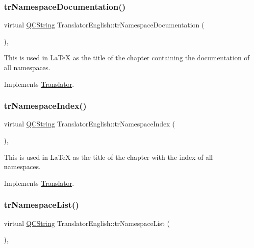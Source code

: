 \subsubsection{\texorpdfstring{trNamespaceDocumentation()}{trNamespaceDocumentation()}}
{\footnotesize\ttfamily virtual \mbox{\hyperlink{class_q_c_string}{Q\+C\+String}} Translator\+English\+::tr\+Namespace\+Documentation (\begin{DoxyParamCaption}{ }\end{DoxyParamCaption})\hspace{0.3cm}{\ttfamily [inline]}, {\ttfamily [virtual]}}

This is used in La\+TeX as the title of the chapter containing the documentation of all namespaces. 

Implements \mbox{\hyperlink{class_translator}{Translator}}.

\mbox{\label{class_translator_english_a91526c150b51f073cbaa179834a6dfd4}} 
\subsubsection{\texorpdfstring{trNamespaceIndex()}{trNamespaceIndex()}}
{\footnotesize\ttfamily virtual \mbox{\hyperlink{class_q_c_string}{Q\+C\+String}} Translator\+English\+::tr\+Namespace\+Index (\begin{DoxyParamCaption}{ }\end{DoxyParamCaption})\hspace{0.3cm}{\ttfamily [inline]}, {\ttfamily [virtual]}}

This is used in La\+TeX as the title of the chapter with the index of all namespaces. 

Implements \mbox{\hyperlink{class_translator}{Translator}}.

\mbox{\label{class_translator_english_af205d2d398a414cdf12e2d8e59143f1d}} 
\subsubsection{\texorpdfstring{trNamespaceList()}{trNamespaceList()}}
{\footnotesize\ttfamily virtual \mbox{\hyperlink{class_q_c_string}{Q\+C\+String}} Translator\+English\+::tr\+Namespace\+List (\begin{DoxyParamCaption}{ }\end{DoxyParamCaption})\hspace{0.3cm}{\ttfamily [inline]}, {\ttfamily [virtual]}}

